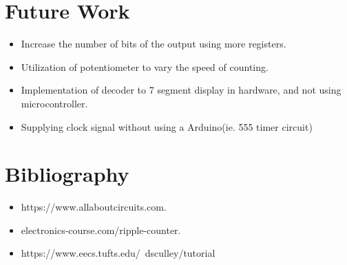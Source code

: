 \documentclass[twoside,twocolumn]{article}
\begin{document}
\section{Future Work}
\begin{itemize}
\item Increase the number of bits of the output using more registers.
\item Utilization of potentiometer to vary the speed of  counting.
\item Implementation of decoder to 7 segment display in hardware, and not using microcontroller.
\item Supplying clock signal without using a Arduino(ie. 555 timer circuit)

\end{itemize}


\section{Bibliography} 
\begin{itemize}
\item https://www.allaboutcircuits.com.

\item electronics-course.com/ripple-counter.

\item https://www.eecs.tufts.edu/~dsculley/tutorial

\end{itemize}
\end{document}

